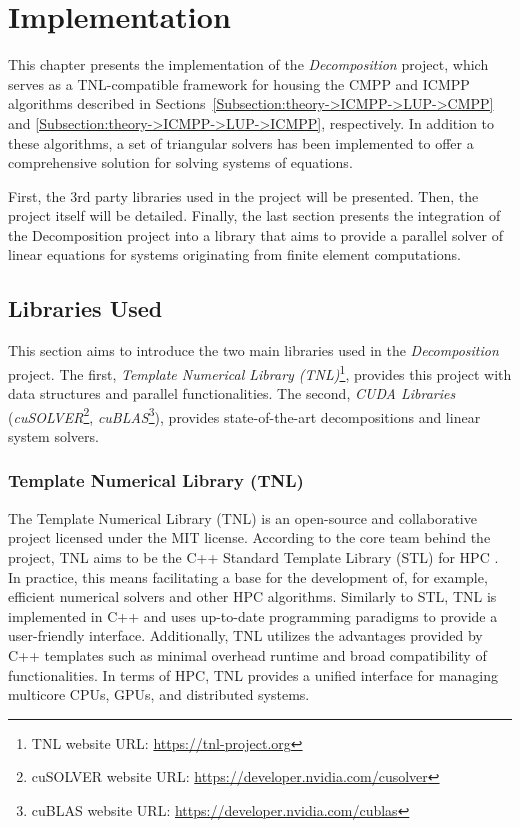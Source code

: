 \chapter{Implementation}\label{Chapter:implementation}
This chapter presents the implementation of the \textit{Decomposition} project, which serves as a TNL-compatible framework for housing the CMPP and ICMPP algorithms described in Sections~\ref{Subsection:theory->ICMPP->LUP->CMPP} and \ref{Subsection:theory->ICMPP->LUP->ICMPP}, respectively.
In addition to these algorithms, a set of triangular solvers has been implemented to offer a comprehensive solution for solving systems of equations.

First, the 3rd party libraries used in the project will be presented.
Then, the project itself will be detailed.
Finally, the last section presents the integration of the Decomposition project into a library that aims to provide a parallel solver of linear equations for systems originating from finite element computations.

\section{Libraries Used}\label{Section:implementation->libraries-used}
This section aims to introduce the two main libraries used in the \textit{Decomposition} project.
The first, \textit{Template Numerical Library (TNL)}\footnote{TNL website URL: \url{https://tnl-project.org}}, provides this project with data structures and parallel functionalities.
The second, \textit{CUDA Libraries} (\textit{cuSOLVER}\footnote{cuSOLVER website URL: \url{https://developer.nvidia.com/cusolver}}, \textit{cuBLAS}\footnote{cuBLAS website URL: \url{https://developer.nvidia.com/cublas}}), provides state-of-the-art decompositions and linear system solvers.

\subsection{Template Numerical Library (TNL)}\label{Subsection:implementation->libraries-used->TNL}
The Template Numerical Library (TNL) \cite{Oberhuber2021, Klinkovsky2022} is an open-source and collaborative project licensed under the MIT license.
According to the core team behind the project, TNL aims to be the C++ Standard Template Library (STL) for HPC \cite{prXEEmGjoxB89XBn}.
In practice, this means facilitating a base for the development of, for example, efficient numerical solvers and other HPC algorithms.
Similarly to STL, TNL is implemented in C++ and uses up-to-date programming paradigms to provide a user-friendly interface.
Additionally, TNL utilizes the advantages provided by C++ templates such as minimal overhead runtime and broad compatibility of functionalities.
In terms of HPC, TNL provides a unified interface for managing multicore CPUs, GPUs, and distributed systems.

